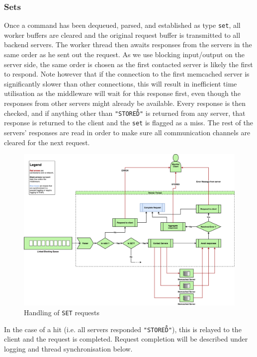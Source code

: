 \documentclass[11pt,a4paper]{article}
\begin{document}
\subsubsection{Sets}
Once a command has been dequeued, parsed, and established as type \texttt{set}, all worker buffers are cleared and the original request buffer is transmitted to all backend servers. The worker thread then awaits responses from the servers in the same order as he sent out the request. As we use blocking input/output on the server side, the same order is chosen as the first contacted server is likely the first to respond. Note however that if the connection to the first memcached server is significantly slower than other connections, this will result in inefficient time utilisation as the middleware will wait for this response first, even though the responses from other servers might already be available. Every response is then checked, and if anything other than \texttt{"STORED\r\n"} is returned from any server, that response is returned to the client and the \texttt{set} is flagged as a miss. The rest of the servers' responses are read in order to make sure all communication channels are cleared for the next request.
\begin{figure}[h]
    \centering
    \includegraphics[width=\textwidth]{processing/graphics/sets_handling.png}
    \caption{Handling of \texttt{SET} requests}
    \label{png::sets_handling}
\end{figure}
In the case of a hit (i.e. all servers responded \texttt{"STORED\r\n"}), this is relayed to the client and the request is completed. Request completion will be described under logging and thread synchronisation below.
\end{document}
